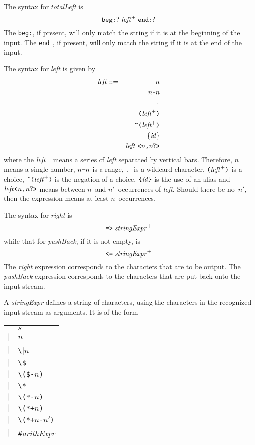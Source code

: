 \documentclass[fleqn]{article}
\newcommand{\mymathtt}[1]{\mbox{\texttt{#1}}}
\newcommand{\mymathit}[1]{\mbox{\emph{#1}}}
\begin{document}
The syntax for \emph{totalLeft} is
\[ \mymathtt{beg:}? \; \mymathit{left}^+ \; \mymathtt{end:}? \]
The \texttt{beg:}, if present, will only match the string if it is
at the beginning of the input.  The \texttt{end:}, if present, will
only match the string if it is at the end of the input.

The syntax for \emph{left} is given by
\begin{eqnarray*}
\mymathit{left} & ::= & n\\
& \mid & n\mymathtt{-}n\\
& \mid & \mymathtt{.}\\
& \mid & \mymathtt{(}\mymathit{left}^+\mymathtt{)}\\
& \mid & \mymathtt{\char94(}\mymathit{left}^+\mymathtt{)}\\
& \mid & \{\mymathit{id}\}\\
& \mid & \mymathit{left}\;\mymathtt{<}n\mymathtt{,}n?\mymathtt{>}\\
\end{eqnarray*}
where the $\mymathit{left}^+$ means a series of \emph{left} separated
by vertical bars.  Therefore, $n$ means a single number, $n\mymathtt{-}n$ is a
range, $\mymathtt{.}$~is a wildcard character, 
$\mymathtt{(}\mymathit{left}^+\mymathtt{)}$ is a choice,
$\mymathtt{\char94(}\mymathit{left}^+\mymathtt{)}$ is the negation of a choice,
$\mymathtt{\char'173}\mymathit{id}\mymathtt{\char'175}$
is the use of an alias and
$\mymathit{left}\mymathtt{<}n\mymathtt{,}n?\mymathtt{>}$
means between $n$~and $n'$~occurrences of \emph{left}.  Should there
be no~$n'$, then the expression means at least $n$~occurrences.

The syntax for \emph{right} is
\[ \mymathtt{=>}\; \mymathit{stringExpr}^+ \]
while that for \emph{pushBack}, if it is not empty, is
\[ \mymathtt{<=}\; \mymathit{stringExpr}^+ \]
The \emph{right} expression corresponds to the characters that are to
be output.  The \emph{pushBack} expression corresponds to the
characters that are put back onto the input stream.

A \emph{stringExpr} defines a string of characters, using the
characters in the recognized input stream as arguments.  It is of the form

\begin{tabular}{ll}
& $s$\\
$\mid$ & $n$\\
$\mid$ & \verb|\|$n$\\
$\mid$ & \verb|\$|\\
$\mid$ & \verb|\($-|$n$\verb|)|\\
$\mid$ & \verb|\*|\\
$\mid$ & \verb|\(*-|$n$\verb|)|\\
$\mid$ & \verb|\(*+|$n$\verb|)|\\
$\mid$ & \verb|\(*+|$n$\verb|-|$n'$\verb|)|\\
$\mid$ & \verb|#|\emph{arithExpr}\\
\end{tabular}
\end{document}
